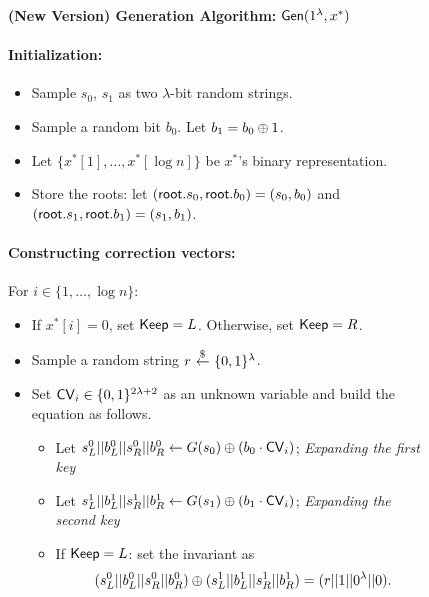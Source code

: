 \begin{figure}
    
    \begin{minipage}{\textwidth}
        \begin{mdframed}
            \begin{center}
                \textbf{(New Version) Generation Algorithm:} ${\sf Gen}(1^\lambda, x^*)$
            \end{center}
            
            \paragraph{Initialization:} 
            \begin{itemize}
                \item Sample $s_0$, $s_1$ as two $\lambda$-bit random strings. 
                \item Sample a random bit $b_0$. Let $b_1=b_0\oplus 1$. 
                \item Let $\{x^*[1],\dots,x^*[\log n]\}$ be $x^*$'s binary representation.
                \item Store the roots: let $({\sf root}.s_0,{\sf root}.b_0)=(s_0,b_0)$ and $({\sf root}.s_1,{\sf root}.b_1)=(s_1,b_1)$.
            \end{itemize}
            
            
            \paragraph{Constructing correction vectors:} 
            For $i\in \{1,\dots, \log n\}$: 
                \begin{itemize}
                    \item If $x^*[i]=0$, set ${\sf Keep}=L$. Otherwise, set ${\sf Keep}=R$.
                    \item Sample a random string $r~{\overset{\$}{\leftarrow}}~ \{0,1\}^{\lambda}$.
                    \item Set ${\sf CV}_i\in\{0,1\}^{2\lambda+2}$ as an unknown variable and build the equation as follows.
                    \begin{itemize}
                        \item Let $s^0_L || b^0_L || s^0_R || b^0_R\leftarrow G(s_0) \oplus (b_0 \cdot {\sf CV}_i)$; \hfill \textit{Expanding the first key}
                        \item Let $s^1_L || b^1_L || s^1_R || b^1_R\leftarrow G(s_1) \oplus (b_1 \cdot {\sf CV}_i)$; \hfill \textit{Expanding the second key}
                        \item If ${\sf Keep}=L$: set the invariant as 
                        \begin{align*}
                            (s^0_L || b^0_L || s^0_R || b^0_R) \oplus (s^1_L || b^1_L || s^1_R || b^1_R) = (r || 1 || 0^{\lambda} || 0).
                        \end{align*}
                       

\end{itemize}
\end{itemize}
\end{mdframed}
\end{minipage}
\end{figure}
